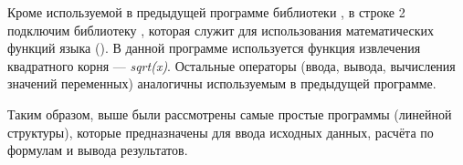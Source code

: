 Кроме используемой в предыдущей программе библиотеки , в строке 2 подключим библиотеку
, которая служит для использования математических 
функций языка (). В данной
программе используется функция извлечения квадратного корня --- \emph{sqrt(x)}. Остальные
операторы (ввода, вывода, вычисления значений переменных) аналогичны используемым в предыдущей программе.

Таким образом, выше были рассмотрены самые простые программы (линейной структуры), которые предназначены для ввода
исходных данных, расчёта по формулам и вывода результатов.

